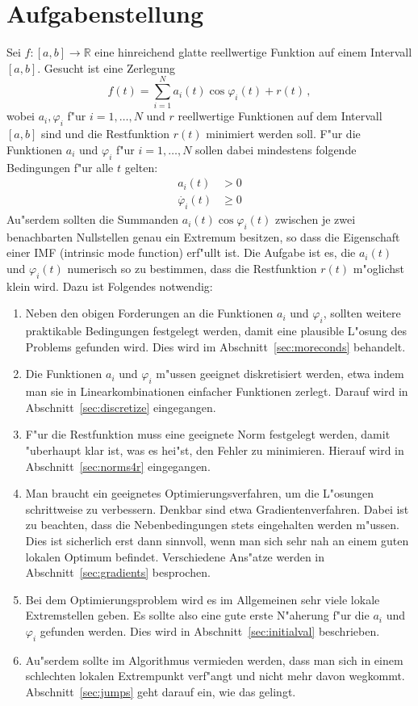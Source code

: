 \documentclass[a4paper]{scrartcl}
\newcommand{\R}{{\mathbb{R}}}
\newcommand{\pphi}{{\varphi}}
\begin{document}
\tableofcontents

\section{Aufgabenstellung}

Sei $f:[a,b]\to\R$ eine hinreichend glatte reellwertige Funktion auf einem Intervall $[a,b]$. Gesucht ist eine Zerlegung
$$ f(t) = \sum_{i=1}^N a_i(t)\cos\pphi_i(t) + r(t)\,, $$
wobei $a_i,\pphi_i$ f"ur $i=1,\dotsc,N$ und $r$ reellwertige Funktionen auf dem Intervall $[a,b]$ sind und die Restfunktion $r(t)$ minimiert werden soll. F"ur die Funktionen $a_i$ und $\pphi_i$ f"ur $i=1,\dotsc,N$ sollen dabei mindestens folgende Bedingungen f"ur alle $t$ gelten:
\begin{align*}
  a_i(t) &> 0 \\
  \dot{\pphi_i}(t) &\ge 0
\end{align*}
Au"serdem sollten die Summanden $a_i(t)\cos\pphi_i(t)$ zwischen je zwei benachbarten Nullstellen genau ein Extremum besitzen, so dass die Eigenschaft einer IMF (intrinsic mode function) erf"ullt ist. Die Aufgabe ist es, die $a_i(t)$ und $\pphi_i(t)$ numerisch so zu bestimmen, dass die Restfunktion $r(t)$ m"oglichst klein wird. Dazu ist Folgendes notwendig:
\begin{enumerate}
  \item Neben den obigen Forderungen an die Funktionen $a_i$ und $\pphi_i$, sollten weitere praktikable Bedingungen festgelegt werden, damit eine plausible L"osung des Problems gefunden wird. Dies wird im Abschnitt~\ref{sec:moreconds} behandelt. 
  \item Die Funktionen $a_i$ und $\pphi_i$ m"ussen geeignet diskretisiert werden, etwa indem man sie in Linearkombinationen einfacher Funktionen zerlegt. Darauf wird in Abschnitt~\ref{sec:discretize} eingegangen.
  \item F"ur die Restfunktion muss eine geeignete Norm festgelegt werden, damit "uberhaupt klar ist, was es hei"st, den Fehler zu minimieren. Hierauf wird in Abschnitt~\ref{sec:norms4r} eingegangen.
  \item Man braucht ein geeignetes Optimierungsverfahren, um die L"osungen schrittweise zu verbessern. Denkbar sind etwa Gradientenverfahren. Dabei ist zu beachten, dass die Nebenbedingungen stets eingehalten werden m"ussen. Dies ist sicherlich erst dann sinnvoll, wenn man sich sehr nah an einem guten lokalen Optimum befindet. Verschiedene Ans"atze werden in Abschnitt~\ref{sec:gradients} besprochen.
  \item Bei dem Optimierungsproblem wird es im Allgemeinen sehr viele lokale Extremstellen geben. Es sollte also eine gute erste N"aherung f"ur die $a_i$ und $\pphi_i$ gefunden werden. Dies wird in Abschnitt~\ref{sec:initialval} beschrieben. 
  \item Au"serdem sollte im Algorithmus vermieden werden, dass man sich in einem schlechten lokalen Extrempunkt verf"angt und nicht mehr davon wegkommt. Abschnitt~\ref{sec:jumps} geht darauf ein, wie das gelingt.
\end{enumerate}
\end{document}
